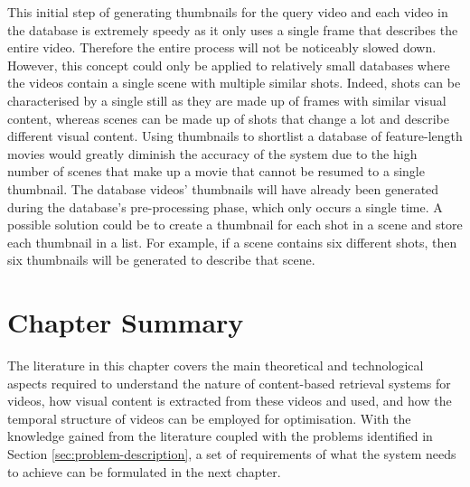 This initial step of generating thumbnails for the query video and each video in the database is extremely speedy as it only uses a single frame that describes the entire video. Therefore the entire process will not be noticeably slowed down. However, this concept could only be applied to relatively small databases where the videos contain a single scene with multiple similar shots. Indeed, shots can be characterised by a single still as they are made up of frames with similar visual content, whereas scenes can be made up of shots that change a lot and describe different visual content. Using thumbnails to shortlist a database of feature-length movies would greatly diminish the accuracy of the system due to the high number of scenes that make up a movie that cannot be resumed to a single thumbnail. The database videos' thumbnails will have already been generated during the database's pre-processing phase, which only occurs a single time. A possible solution could be to create a thumbnail for each shot in a scene and store each thumbnail in a list. For example, if a scene contains six different shots, then six thumbnails will be generated to describe that scene.


\section{Chapter Summary}

The literature in this chapter covers the main theoretical and technological aspects required to understand the nature of content-based retrieval systems for videos, how visual content is extracted from these videos and used, and how the temporal structure of videos can be employed for optimisation. With the knowledge gained from the literature coupled with the problems identified in Section \ref{sec:problem-description}, a set of requirements of what the system needs to achieve can be formulated in the next chapter.